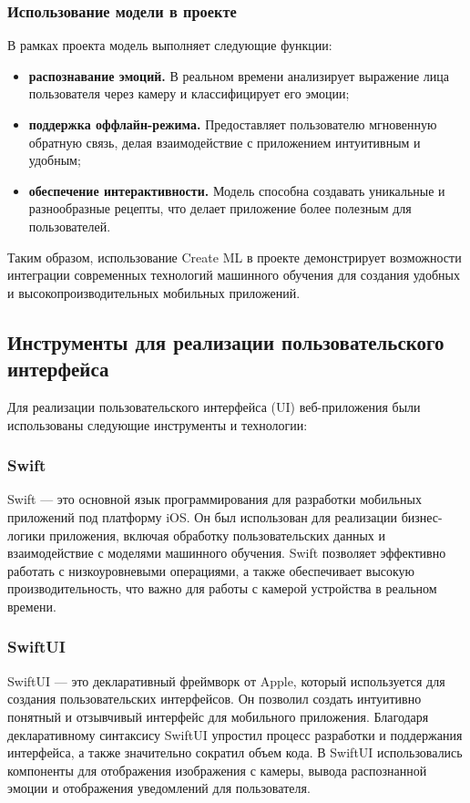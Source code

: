 {{\subsubsection*{Использование модели в проекте}
В рамках проекта модель выполняет следующие функции:
\begin{itemize}
    \item \textbf{распознавание эмоций.} В реальном времени анализирует выражение лица пользователя через камеру и классифицирует его эмоции;
    \item \textbf{поддержка оффлайн-режима.} Предоставляет пользователю мгновенную обратную связь, делая взаимодействие с приложением интуитивным и удобным;
    \item \textbf{обеспечение интерактивности.} Модель способна создавать уникальные и разнообразные рецепты, что делает приложение более полезным для пользователей.
\end{itemize}

Таким образом, использование Create ML в проекте демонстрирует возможности интеграции современных технологий машинного обучения для создания удобных и высокопроизводительных мобильных приложений.
}
\subsection{Инструменты для реализации пользовательского интерфейса}
Для реализации пользовательского интерфейса (UI) веб-приложения были использованы следующие инструменты и технологии:

\subsubsection*{Swift}
Swift — это основной язык программирования для разработки мобильных приложений под платформу iOS. Он был использован для реализации бизнес-логики приложения, включая обработку пользовательских данных и взаимодействие с моделями машинного обучения. Swift позволяет эффективно работать с низкоуровневыми операциями, а также обеспечивает высокую производительность, что важно для работы с камерой устройства в реальном времени.

\subsubsection*{SwiftUI}
SwiftUI — это декларативный фреймворк от Apple, который используется для создания пользовательских интерфейсов. Он позволил создать интуитивно понятный и отзывчивый интерфейс для мобильного приложения. Благодаря декларативному синтаксису SwiftUI упростил процесс разработки и поддержания интерфейса, а также значительно сократил объем кода. В SwiftUI использовались компоненты для отображения изображения с камеры, вывода распознанной эмоции и отображения уведомлений для пользователя.

}
